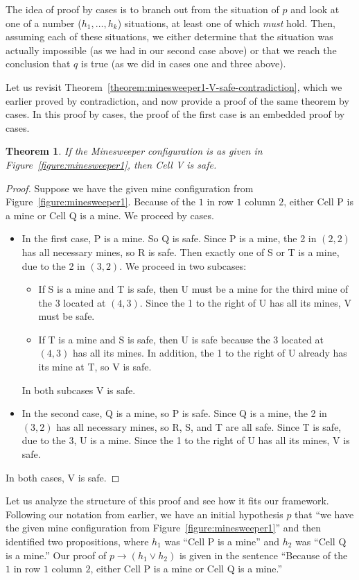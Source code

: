 \documentclass{book}
\newcounter{ekcounter}%
\theoremstyle{ekimcustom}
\newtheorem{theorem}[ekcounter]{Theorem}
\begin{document}
The idea of proof by cases is to branch out from the situation of $p$ and look at one of a number ($h_1,\dots,h_k$) situations, at least one of which \emph{must} hold. Then, assuming each of these situations, we either determine that the situation was actually impossible (as we had in our second case above) or that we reach the conclusion that $q$ is true (as we did in cases one and three above).

Let us revisit Theorem~\ref{theorem:minesweeper1-V-safe-contradiction}, which we earlier proved by contradiction, and now provide a proof of the same theorem by cases. In this proof by cases, the proof of the first case is an embedded proof by cases.
\begin{theorem}
If the Minesweeper configuration is as given in Figure~\ref{figure:minesweeper1}, then Cell V is safe.
\end{theorem}
\begin{proof}
Suppose we have the given mine configuration from Figure~\ref{figure:minesweeper1}.
Because of the $1$ in row $1$ column $2$, either Cell P is a mine or Cell Q is a mine. We proceed by cases.
\begin{itemize}
\item In the first case, P is a mine. So Q is safe. Since P is a mine, the 2 in $(2,2)$ has all necessary mines, so R is safe. Then exactly one of S or T is a mine, due to the 2 in $(3,2)$. We proceed in two subcases:
\begin{itemize}
\item If S is a mine and T is safe, then U must be a mine for the third mine of the 3 located at $(4,3)$. Since the 1 to the right of U has all its mines, V must be safe.
\item If T is a mine and S is safe, then U is safe because the 3 located at $(4,3)$ has all its mines.  In addition, the 1 to the right of U already has its mine at T, so V is safe.
\end{itemize}
In both subcases V is safe.
\item In the second case, Q is a mine, so P is safe. Since Q is a mine, the 2 in $(3,2)$ has all necessary mines, so R, S, and T are all safe. Since T is safe, due to the 3, U is a mine. Since the 1 to the right of U has all its mines, V is safe.
\end{itemize}
In both cases, V is safe.
\end{proof}
Let us analyze the structure of this proof and see how it fits our framework. Following our notation from earlier, we have an initial hypothesis $p$ that ``we have the given mine configuration from Figure~\ref{figure:minesweeper1}'' and then identified two propositions, where $h_1$ was ``Cell P is a mine'' and $h_2$ was ``Cell Q is a mine.'' Our proof of $p \rightarrow (h_1 \vee h_2)$ is given in the sentence ``Because of the $1$ in row $1$ column $2$, either Cell P is a mine or Cell Q is a mine.''
\end{document}
